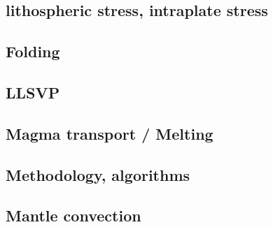 \subsection*{lithospheric stress, intraplate stress}

\cite{fouy75}
\cite{riso76}
\cite{riso79}
\cite{worg91}
\cite{rich92}\cite{wuvr92}\cite{zoba92}
\cite{stsm01}
\cite{ligu04}
\cite{timr05}
\cite{bilr08}\cite{ghhw08}
\cite{ghhf09}
\cite{nacl09}
\cite{nalr12}\cite{ghho12}
\cite{ghhw13}


\subsection*{Folding}

\cite{ramb68}
\cite{ramb70}
\cite{ramb71}
\cite{reds12}
\cite{regc13}

\subsection*{LLSVP}

\cite{limc13}

\subsection*{Magma transport / Melting}

\cite{yatd12}
\cite{lorg18}

\subsection*{Methodology, algorithms}

\cite{leka93}

\subsection*{Mantle convection}

\cite{hemw75}
\cite{ludt79}
\cite{olco80}\cite{jamc80}
\cite{jape82}\cite{homc82}
\cite{hous83}\cite{hous83b}
\cite{olyb84}\cite{jarv84}\cite{haeb84}\cite{harp84}\cite{davi84}
\cite{jarv85}
\cite{davi86}
\cite{yuqh87}
\cite{zhch93}\cite{jarv93}\cite{tack93}
\cite{haeb94}
\cite{zhgu95}
\cite{zhyu96}\cite{hond96}\cite{rytr96a}\cite{rytr96b}\cite{tack96}\cite{trbo96}
\cite{hond97}\cite{iwho97}
\cite{ande98}\cite{iwho98}\cite{devv98}\cite{tack98}\cite{tack98b}\cite{trha98b}\cite{trha98}
\cite{duyr99}
\cite{albe00}\cite{hayu00}\cite{devv00b}\cite{tack00b}\cite{zhzm00}
\cite{tasu02}
\cite{hapa03}
\cite{taxn05}
\cite{nake07}
\cite{tack08}
\cite{wodd09}
\cite{lowm11}\cite{rota11}\cite{woda11}
\cite{holj13}\cite{dadb13}\cite{toyd13}
\cite{arfw14}\cite{helo14}
\cite{thkp15}

